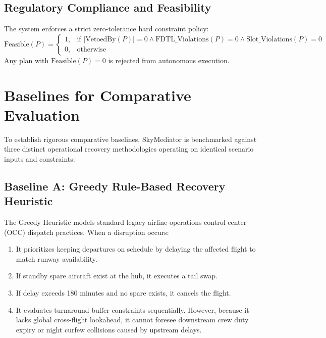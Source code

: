\subsection{Regulatory Compliance and Feasibility}
The system enforces a strict zero-tolerance hard constraint policy:
\begin{equation}
    \text{Feasible}(P) = 
    \begin{cases} 
      1, & \text{if } |\text{VetoedBy}(P)| = 0 \land \text{FDTL\_Violations}(P) = 0 \land \text{Slot\_Violations}(P) = 0 \\
      0, & \text{otherwise}
    \end{cases}
\end{equation}
Any plan with $\text{Feasible}(P) = 0$ is rejected from autonomous execution.

\section{Baselines for Comparative Evaluation}
\label{sec:baselines}

To establish rigorous comparative baselines, SkyMediator is benchmarked against three distinct operational recovery methodologies operating on identical scenario inputs and constraints:

\subsection{Baseline A: Greedy Rule-Based Recovery Heuristic}
The Greedy Heuristic models standard legacy airline operations control center (OCC) dispatch practices. When a disruption occurs:
\begin{enumerate}
    \item It prioritizes keeping departures on schedule by delaying the affected flight to match runway availability.
    \item If standby spare aircraft exist at the hub, it executes a tail swap.
    \item If delay exceeds 180 minutes and no spare exists, it cancels the flight.
    \item It evaluates turnaround buffer constraints sequentially. However, because it lacks global cross-flight lookahead, it cannot foresee downstream crew duty expiry or night curfew collisions caused by upstream delays.
\end{enumerate}

